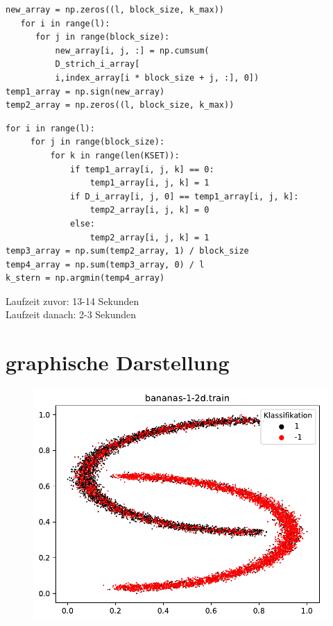 \documentclass{beamer}
\begin{document}
\begin{frame}[fragile]
\begin{verbatim}
new_array = np.zeros((l, block_size, k_max))  
   for i in range(l):
      for j in range(block_size):
          new_array[i, j, :] = np.cumsum(
          D_strich_i_array[
          i,index_array[i * block_size + j, :], 0])
temp1_array = np.sign(new_array)
temp2_array = np.zeros((l, block_size, k_max))
\end{verbatim}
\end{frame}


\begin{frame}[fragile]
\begin{verbatim}
for i in range(l):
     for j in range(block_size):
         for k in range(len(KSET)):
             if temp1_array[i, j, k] == 0:
                 temp1_array[i, j, k] = 1
             if D_i_array[i, j, 0] == temp1_array[i, j, k]:
                 temp2_array[i, j, k] = 0
             else:
                 temp2_array[i, j, k] = 1
temp3_array = np.sum(temp2_array, 1) / block_size
temp4_array = np.sum(temp3_array, 0) / l
k_stern = np.argmin(temp4_array)
\end{verbatim}
Laufzeit zuvor: 13-14 Sekunden\\
Laufzeit danach: 2-3 Sekunden
\end{frame}



\section{graphische Darstellung}
\begin{figure}[h]
\centering
\includegraphics[scale=0.7]{bananas-1-2d-train.pdf}
\label{bananas}
\end{figure}
\end{document}
